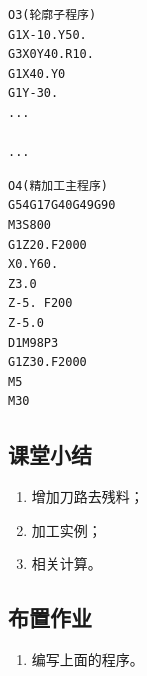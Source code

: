 \begin{lstlisting}
O3(轮廓子程序)
G1X-10.Y50.
G3X0Y40.R10.
G1X40.Y0
G1Y-30.
...

...

\end{lstlisting}












\begin{lstlisting}
O4(精加工主程序)
G54G17G40G49G90
M3S800
G1Z20.F2000
X0.Y60.
Z3.0
Z-5. F200
Z-5.0
D1M98P3
G1Z30.F2000
M5 
M30
\end{lstlisting}




\subsection{课堂小结}
\begin{enumerate}[1、]
	\item 增加刀路去残料；
	\item 加工实例；
	\item 相关计算。
\end{enumerate}

\vfill
\subsection{布置作业}
\begin{enumerate}[1、]
	\item 编写上面的程序。
\end{enumerate}
\vfill